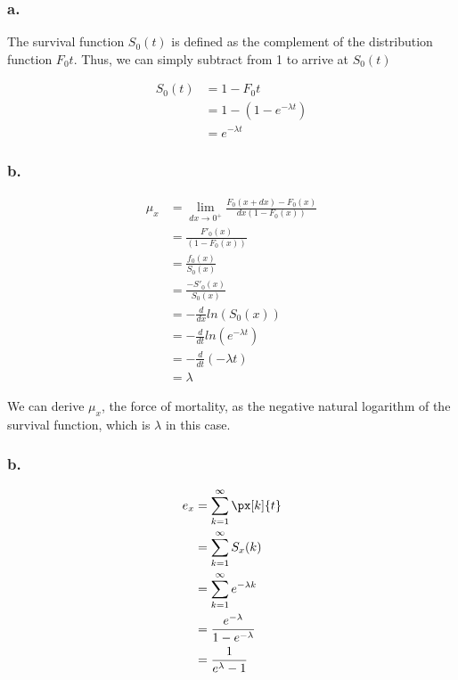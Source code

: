 \documentclass[
]{article}
\begin{document}
\hypertarget{a.}{%
\subsubsection{a.}\label{a.}}

The survival function \(S_{0}(t)\) is defined as the complement of the
distribution function \(F_{0}t\). Thus, we can simply subtract from 1 to
arrive at \(S_{0}(t)\)

\[
\begin{aligned}
S_{0}(t) &= 1 - F_{0}t \\
&= 1 - (1 - e^{-\lambda t}) \\
&= e^{-\lambda t}
\end{aligned}
\]

\hypertarget{b.}{%
\subsubsection{b.}\label{b.}}

\[
\begin{aligned}
\mu_{x} &= \lim_{dx \rightarrow 0^{+}} \frac{F_{0}(x + dx) - F_{0} (x)}{dx(1 - F_{0}(x))} \\
&= \frac{F'_{0}(x)}{(1 - F_{0}(x))} \\
&= \frac{f_{0}(x)}{S_{0}(x)} \\
&= \frac{-S'_{0}(x)}{S_{0}(x)} \\
&= - \frac{d}{dx} ln(S_{0}(x))\\
&= - \frac{d}{dt} ln(e^{-\lambda t}) \\
&= - \frac{d}{dt} (- \lambda t) \\
&= \lambda
\end{aligned}
\]

We can derive \(\mu_{x}\), the force of mortality, as the negative
natural logarithm of the survival function, which is \(\lambda\) in this
case.

\hypertarget{b.-1}{%
\subsubsection{b.}\label{b.-1}}

\[
\begin{aligned}
e_{x} &= \sum_{k = 1}^{\infty} \px[k]{t} \\
&= \sum_{k = 1}^{\infty} S_{x}(k) \\
&= \sum_{k = 1}^{\infty} e^{-\lambda k} \\
&= \frac{e^{-\lambda}}{1 - e^{-\lambda}} \\
&= \frac{1}{e^{\lambda}- 1} 
\end{aligned}
\]
\end{document}
